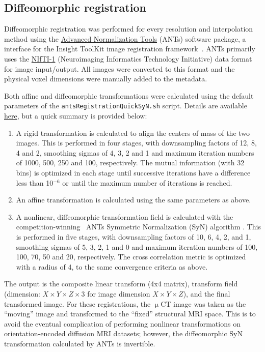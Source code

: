 \documentclass[11pt]{article}
\begin{document}
\subsection{Diffeomorphic registration}
Diffeomorphic registration was performed for every resolution and interpolation
method using the \href{http://stnava.github.io/ANTs/}{Advanced Normalization
  Tools} (ANTs) software package, a interface for the Insight ToolKit image
registration framework~\cite{itk}. ANTs primarily uses the
\href{https://nifti.nimh.nih.gov}{NIfTI-1} (Neuroimaging Informatics Technology
Initiative) data format for image input/output. All images were converted to
this format and the physical voxel dimensions were manually added to the
metadata.

Both affine and diffeomorphic transformations were calculated using the default
parameters of the \newline\verb|antsRegistrationQuickSyN.sh| script. Details are
available
\href{https://github.com/stnava/ANTsTutorial/blob/master/registration/registration.Rmd#lets-start-out-small-and-use-wrapper-scripts}{here},
but a quick summary is provided below:
\begin{enumerate}
\item A rigid transformation is calculated to align the
  centers of mass of the two images. This is performed in four stages, with
  downsampling factors of 12, 8, 4 and 2, smoothing sigmas of 4, 3, 2 and 1 and
  maximum iteration numbers of 1000, 500, 250 and 100, respectively. The mutual
  information (with 32 bins) is optimized in each stage until successive iterations have a
  difference less than 10$^{-6}$ or until the maximum number of iterations is
  reached.
\item An affine transformation is calculated using the same
  parameters as above.
\item A nonlinear, diffeomorphic transformation field is calculated with the
  competition-winning~\cite{competition} ANTs Symmetric Normalization (SyN)
  algorithm \cite{avants2008}. This is performed in five stages, with
  downsampling factors of 10, 6, 4, 2, and 1, smoothing sigmas of 5, 3, 2, 1 and
  0 and maximum iteration numbers of 100, 100, 70, 50 and 20, respectively. The
  cross correlation metric is optimized with a radius of 4, to the same
  convergence criteria as above.
\end{enumerate}

The output is the composite linear transform (4x4 matrix), transform field
(dimension: $X\times Y\times Z \times 3$ for image dimension
$X\times Y\times Z$), and the final transformed image. For these registrations,
the $\upmu$CT image was taken as the ``moving'' image and transformed to the
``fixed'' structural MRI space. This is to avoid the eventual complication of
performing nonlinear transformations on orientation-encoded diffusion MRI
datasets; however, the diffeomorphic SyN transformation calculated by ANTs is
invertible.
\end{document}
